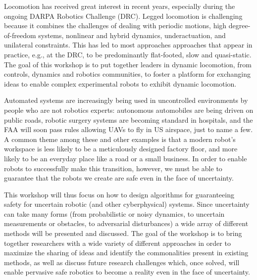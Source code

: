 \begin{spacing}{1.0}
{
Locomotion has received great interest in recent years, especially during the ongoing DARPA Robotics Challenge (DRC).  Legged locomotion is challenging because it combines the challenges of dealing with periodic motions, high degree-of-freedom systems, nonlinear and hybrid dynamics, underactuation, and unilateral constraints.  This has led to most approaches approaches that appear in practice, e.g., at the DRC, to be predominantly flat-footed, slow and quasi-static.  The goal of this workshop is to put together leaders in dynamic locomotion, from controls, dynamics and robotics communities, to foster a platform for exchanging ideas to enable complex experimental robots to exhibit dynamic locomotion.
}



{
Automated systems are increasingly being used in uncontrolled environments by people who are not robotics experts: autonomous automobiles are being driven on public roads, robotic surgery systems are becoming standard in hospitals, and the FAA will soon pass rules allowing UAVs to fly in US airspace, just to name a few. A common theme among these and other examples is that a modern robot's workspace is less likely to be a meticulously designed factory floor, and more likely to be an everyday place like a road or a small business. In order to enable robots to successfully make this transition, however, we must be able to guarantee that the robots we create are safe even in the face of uncertainty.

This workshop will thus focus on how to design algorithms for guaranteeing safety for uncertain robotic (and other cyberphysical) systems. Since uncertainty can take many forms (from probabilistic or noisy dynamics, to uncertain measurements or obstacles, to adversarial disturbances) a wide array of different methods will be presented and discussed. The goal of the workshop is to bring together researchers with a wide variety of different approaches in order to maximize the sharing of ideas and identify the commonalities present in existing methods, as well as discuss future research challenges which, once solved, will enable pervasive safe robotics to become a reality even in the face of uncertainty.
}




\end{spacing}
